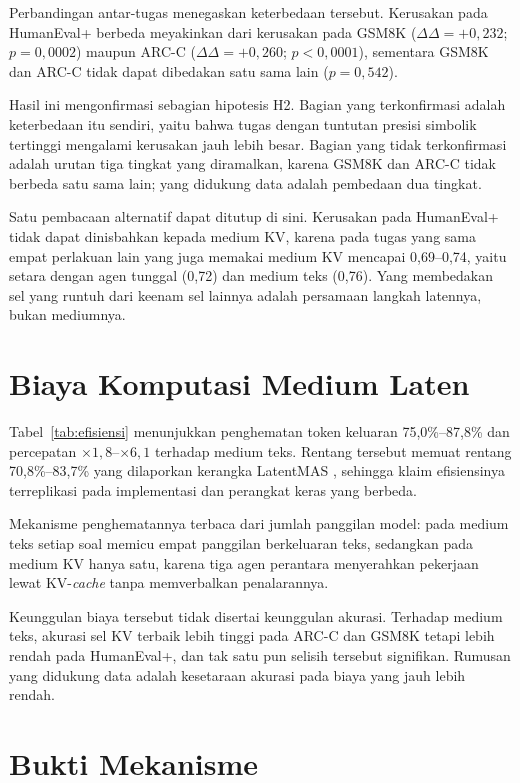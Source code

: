Perbandingan antar-tugas menegaskan keterbedaan tersebut. Kerusakan pada
HumanEval+ berbeda meyakinkan dari kerusakan pada GSM8K ($\Delta\Delta =
+0{,}232$; $p = 0{,}0002$) maupun ARC-C ($\Delta\Delta = +0{,}260$;
$p < 0{,}0001$), sementara GSM8K dan ARC-C tidak dapat dibedakan satu sama lain
($p = 0{,}542$).

Hasil ini mengonfirmasi sebagian hipotesis H2. Bagian yang terkonfirmasi adalah
keterbedaan itu sendiri, yaitu bahwa tugas dengan tuntutan presisi simbolik
tertinggi mengalami kerusakan jauh lebih besar. Bagian yang tidak terkonfirmasi
adalah urutan tiga tingkat yang diramalkan, karena GSM8K dan ARC-C tidak
berbeda satu sama lain; yang didukung data adalah pembedaan dua tingkat.

Satu pembacaan alternatif dapat ditutup di sini. Kerusakan pada HumanEval+ tidak
dapat dinisbahkan kepada medium KV, karena pada tugas yang sama empat perlakuan
lain yang juga memakai medium KV mencapai 0,69--0,74, yaitu setara dengan agen
tunggal (0,72) dan medium teks (0,76). Yang membedakan sel yang runtuh dari
keenam sel lainnya adalah persamaan langkah latennya, bukan mediumnya.

\section{Biaya Komputasi Medium Laten}



Tabel~\ref{tab:efisiensi} menunjukkan penghematan token keluaran
75,0\%--87,8\% dan percepatan $\times 1{,}8$--$\times 6{,}1$ terhadap medium
teks. Rentang tersebut memuat rentang 70,8\%--83,7\% yang dilaporkan kerangka
LatentMAS \citep{latentmas}, sehingga klaim efisiensinya terreplikasi pada
implementasi dan perangkat keras yang berbeda.

Mekanisme penghematannya terbaca dari jumlah panggilan model: pada medium teks
setiap soal memicu empat panggilan berkeluaran teks, sedangkan pada medium KV
hanya satu, karena tiga agen perantara menyerahkan pekerjaan lewat
KV-\textit{cache} tanpa memverbalkan penalarannya.

Keunggulan biaya tersebut tidak disertai keunggulan akurasi. Terhadap medium
teks, akurasi sel KV terbaik lebih tinggi pada ARC-C dan GSM8K tetapi lebih
rendah pada HumanEval+, dan tak satu pun selisih tersebut signifikan. Rumusan
yang didukung data adalah kesetaraan akurasi pada biaya yang jauh lebih rendah.

\section{Bukti Mekanisme}

